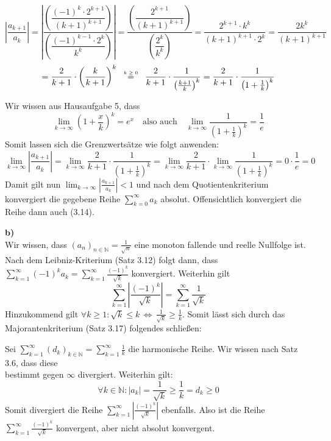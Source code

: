 \documentclass[a4paper,graphics,11pt]{article}
\newcommand{\up}[2]{\mathrel{\overset{\makebox[0pt]{\mbox{\normalfont\tiny #2}}}{#1}}}
\begin{document}
$$
    \left| \frac{a_{k+1}}{a_k}\right|
    = \left|\frac{\left(\dfrac{(-1)^k\cdot2^{k+1}}{(k+1)^{k+1}}\right)}{\left(\dfrac{(-1)^{k-1}\cdot 2^k}{k^k}\right)}\right|
    = \frac{\left(\dfrac{2^{k+1}}{(k+1)^{k+1}}\right)}{\left(\dfrac{2^k}{k^k}\right)}
    = \frac{2^{k+1}\cdot k^k}{(k+1)^{k+1} \cdot 2^k}
    = \frac{2k^k}{(k+1)^{k+1}}
$$$$
    =\frac{2}{k+1} \cdot \left(\frac{k}{k+1}\right)^k
    \quad\up{=}{$k\geq 0$}\quad \frac{2}{k+1} \cdot \frac{1}{\left(\frac{k+1}{k}\right)^k}
    = \frac{2}{k+1} \cdot \frac{1}{\left(1+\frac{1}{k}\right)^k}
$$

Wir wissen aus Hausaufgabe 5, dass
$$
    \lim_{k \to \infty} \left(1+\frac{x}{k}\right)^k = e^x\quad \text{also auch}\quad
    \lim_{k \to \infty} \frac{1}{\left(1+\frac{1}{k}\right)^k} = \frac{1}{e}
$$
Somit lassen sich die Grenzwertsätze wie folgt anwenden:
$$
    \lim_{k \to \infty} \left |\frac{a_{k+1}}{a_k}\right|
    = \lim_{k \to \infty} \frac{2}{k+1} \cdot \frac{1}{\left(1+\frac{1}{k}\right)^k}
    = \lim_{k \to \infty} \frac{2}{k+1} \cdot \lim_{k \to \infty} \frac{1}{\left(1+\frac{1}{k} \right)^k}
    = 0 \cdot \frac{1}{e} = 0
$$
Damit gilt nun $\lim_{k \to \infty}\limits \left|\frac{a_{k+1}}{a_k} \right| < 1$ und nach dem
Quotientenkriterium konvergiert die gegebene Reihe $\sum_{k=0}^{\infty} a_k$ absolut.
Offensichtlich konvergiert die Reihe dann auch (3.14).

\textbf{b)}\\[5pt]
Wir wissen, dass $(a_n)_{n\in \mathbb{N}} = \frac{1}{\sqrt{n}}$ eine monoton fallende und
reelle Nullfolge ist. Nach dem Leibniz-Kriterium (Satz 3.12) folgt dann, dass
$\sum_{k=1}^{\infty} (-1)^ka_k = \sum_{k=1}^{\infty} \frac{(-1)^k}{\sqrt{k}}$ konvergiert.
Weiterhin gilt
$$
    \sum_{k=1}^{\infty} \left|\frac{(-1)^k}{\sqrt{k}}\right|
    = \sum_{k=1}^{\infty} \frac{1}{\sqrt{k}}
$$
Hinzukommend gilt $\forall k \geq 1\colon \sqrt{k}\leq k \,\Longleftrightarrow\, \frac{1}{\sqrt{k}}\geq \frac{1}{k}$.
Somit lässt sich durch das\\
Majorantenkriterium (Satz 3.17) folgendes schließen:

Sei $\sum_{k=1}^{\infty} (d_k)_{k\in \mathbb{N}}= \sum_{k=1}^{\infty} \frac{1}{k}$
die harmonische Reihe. Wir wissen nach Satz 3.6, dass diese\\
bestimmt gegen $\infty$ divergiert.
Weiterhin gilt:
$$
    \forall k \in \mathbb{N}\colon |a_k| = \frac{1}{\sqrt{k}} \geq \frac{1}{k} = d_k \geq 0
$$
Somit divergiert die Reihe $\sum_{k=1}^{\infty}\left|\frac{(-1)^k}{\sqrt{k}}\right|$
ebenfalls. Also ist die Reihe $\sum_{k=1}^{\infty} \frac{(-1)^k}{\sqrt{k}}$ konvergent, aber nicht
absolut konvergent.
\end{document}
